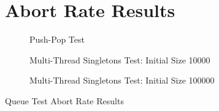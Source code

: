 \section{Abort Rate Results}
\label{app:queue_mt}

\begin{table}[H]
\begin{figure}[H]
    \centering
    
    \caption*{Push-Pop Test}
\end{figure}
\begin{figure}[H]
    \centering
        
    \caption*{Multi-Thread Singletons Test: Initial Size 10000}
\end{figure}
\begin{figure}[H]
    \centering
    
    \caption*{Multi-Thread Singletons Test: Initial Size 100000}
\end{figure}
    \caption{Queue Test Abort Rate Results}
\end{table}
